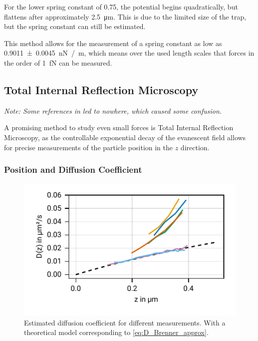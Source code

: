 \documentclass[
    twoside=false,
    twocolumn=true,
    fontsize=11pt,
]{scrarticle}
\begin{document}
For the lower spring constant of \SI{0.75}{}, the potential begins quadratically, but flattens after approximately \SI{2.5}{\micro m}.
This is due to the limited size of the trap, but the spring constant can still be estimated.

This method allows for the measurement of a spring constant as low as \SI{0.9011(45)}{\nano N /m}, which means over the used length scales that forces in the order of \SI{1}{\femto N} can be measured.

\subsection{Total Internal Reflection Microscopy}
\emph{Note: Some references in \cite{instructions} led to nowhere, which caused some confusion.}

A promising method to study even small forces is Total Internal Reflection Microscopy, as the controllable exponential decay of the evanescent field allows for precise measurements of the particle position in the $z$ direction.

\subsubsection*{Position and Diffusion Coefficient}
\begin{figure}
    \centering
    \includegraphics{figures/02_04_01_diffusion.pdf}
    \caption{Estimated diffusion coefficient for different measurements. With a theoretical model corresponding to \autoref{eq:D_Brenner_approx}.}
    \label{fig:D_of_z}
\end{figure}
\end{document}
